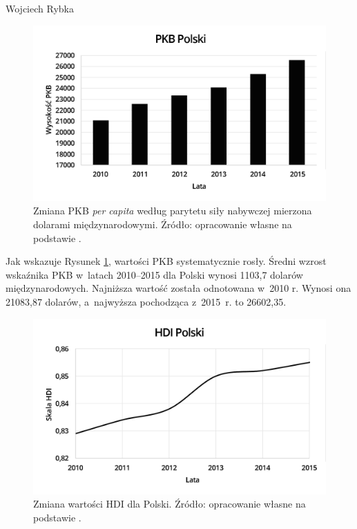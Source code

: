 \begin{artplenv}{Wojciech Rybka}
\begin{figure}[h]
	\centering
	\includegraphics[width=1\textwidth]{ART_Rybka/pkb_polski.png} 
	\caption{Zmiana PKB \textit{per capita} według parytetu siły nabywczej mierzona dolarami międzynarodowymi.
		Źródło: opracowanie własne na podstawie
		\parencite{international_monetary_fund_world_2019a}.
	}
	\label{fig1:ryb}
\end{figure}


%
%
%

Jak wskazuje Rysunek \ref{fig1:ryb}, wartości PKB systematycznie rosły. Średni wzrost wskaźnika PKB w~latach 2010–2015 dla Polski
wynosi 1103,7 dolarów międzynarodowych. Najniższa wartość została odnotowana w~2010 r. Wynosi ona 21083,87 dolarów,
a~najwyższa pochodząca z~2015~r. to 26602,35. 

\begin{figure}[H]
	\centering
	\includegraphics[width=1\textwidth]{ART_Rybka/hdi_polski.png} 
	\caption{Zmiana wartości HDI dla Polski.
		Źródło: opracowanie własne na podstawie
		\parencite{united_nations_development_programme_human_2019}.
	}
	\label{fig2:ryb}
\end{figure}



\end{artplenv}
